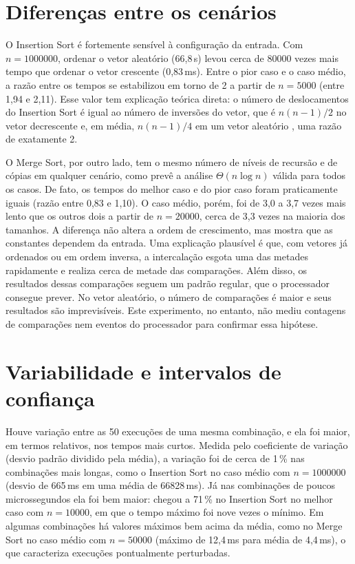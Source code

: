 \documentclass[
    12pt,
    oneside,
    a4paper,
    openany,
    chapter=TITLE,
    english,
    brazil
]{abntex2}
\begin{document}
\section{Diferenças entre os cenários}
\label{sec:cenarios}

O Insertion Sort é fortemente sensível à configuração da entrada. Com $n = \num{1000000}$, ordenar o vetor aleatório (66,8\,s) levou cerca de \num{80000} vezes mais tempo que ordenar o vetor crescente (0,83\,ms). Entre o pior caso e o caso médio, a razão entre os tempos se estabilizou em torno de 2 a partir de $n = \num{5000}$ (entre 1,94 e 2,11). Esse valor tem explicação teórica direta: o número de deslocamentos do Insertion Sort é igual ao número de inversões do vetor, que é $n(n-1)/2$ no vetor decrescente e, em média, $n(n-1)/4$ em um vetor aleatório \cite{knuth1998}, uma razão de exatamente 2.

O Merge Sort, por outro lado, tem o mesmo número de níveis de recursão e de cópias em qualquer cenário, como prevê a análise $\Theta(n \log n)$ válida para todos os casos. De fato, os tempos do melhor caso e do pior caso foram praticamente iguais (razão entre 0,83 e 1,10). O caso médio, porém, foi de 3,0 a 3,7 vezes mais lento que os outros dois a partir de $n = \num{20000}$, cerca de 3,3 vezes na maioria dos tamanhos. A diferença não altera a ordem de crescimento, mas mostra que as constantes dependem da entrada. Uma explicação plausível é que, com vetores já ordenados ou em ordem inversa, a intercalação esgota uma das metades rapidamente e realiza cerca de metade das comparações. Além disso, os resultados dessas comparações seguem um padrão regular, que o processador consegue prever. No vetor aleatório, o número de comparações é maior e seus resultados são imprevisíveis. Este experimento, no entanto, não mediu contagens de comparações nem eventos do processador para confirmar essa hipótese.

\section{Variabilidade e intervalos de confiança}
\label{sec:variabilidade}

Houve variação entre as 50 execuções de uma mesma combinação, e ela foi maior, em termos relativos, nos tempos mais curtos. Medida pelo coeficiente de variação (desvio padrão dividido pela média), a variação foi de cerca de 1\,\% nas combinações mais longas, como o Insertion Sort no caso médio com $n = \num{1000000}$ (desvio de 665\,ms em uma média de \num{66828}\,ms). Já nas combinações de poucos microssegundos ela foi bem maior: chegou a 71\,\% no Insertion Sort no melhor caso com $n = \num{10000}$, em que o tempo máximo foi nove vezes o mínimo. Em algumas combinações há valores máximos bem acima da média, como no Merge Sort no caso médio com $n = \num{50000}$ (máximo de 12,4\,ms para média de 4,4\,ms), o que caracteriza execuções pontualmente perturbadas.
\end{document}
